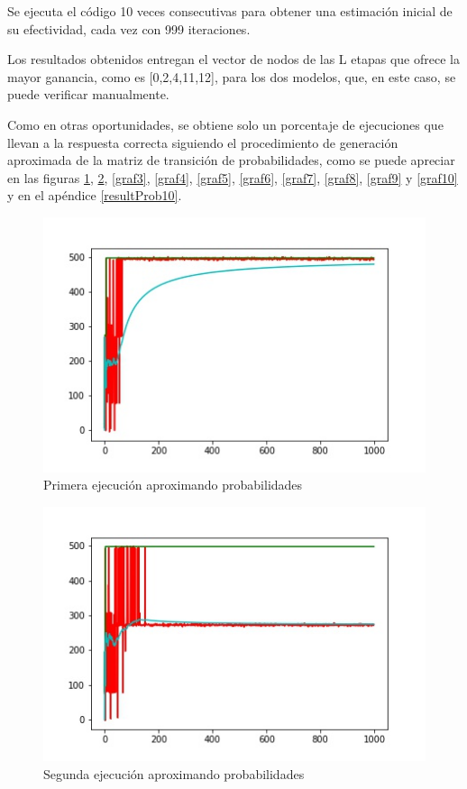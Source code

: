 Se ejecuta el código 10 veces consecutivas para obtener una estimación inicial de su efectividad, cada vez con 999 iteraciones.

Los resultados obtenidos entregan el vector de nodos de las L etapas que ofrece la mayor ganancia, como es [0,2,4,11,12], para los dos modelos, que, en este caso, se puede verificar manualmente.

Como en otras oportunidades, se obtiene solo un porcentaje de ejecuciones que llevan a la respuesta correcta siguiendo el procedimiento de generación aproximada de la matriz de transición de probabilidades, como se puede apreciar en las figuras \ref{graf1}, \ref{graf2}, \ref{graf3}, \ref{graf4}, \ref{graf5}, \ref{graf6}, \ref{graf7}, \ref{graf8}, \ref{graf9} y \ref{graf10} y en el apéndice \ref{resultProb10}.

\begin{figure}
  \centering
    \includegraphics[scale=0.9]{grafi1.jpg}
  \caption[Primera ejecución]{Primera ejecución aproximando probabilidades}
  \label{graf1}
\end{figure}
\begin{figure}
  \centering
    \includegraphics[scale=0.9]{grafi2.jpg}
  \caption[Segunda ejecución]{Segunda ejecución aproximando probabilidades}
  \label{graf2}
\end{figure}
